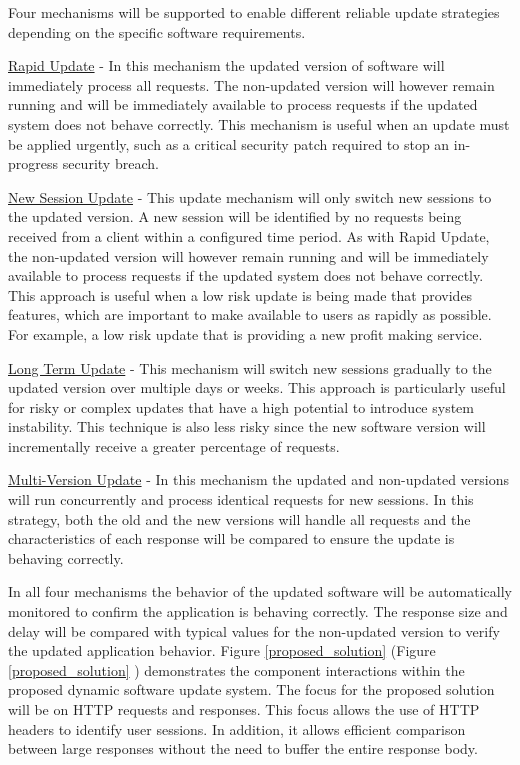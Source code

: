 \documentclass[a4paper,11pt,twoside]{article}
\begin{document}
Four mechanisms will be supported to enable different reliable update strategies depending on the specific software requirements.

\underline{Rapid Update} -  In this mechanism the updated version of software will immediately process all requests. The non-updated version will however remain running and will be immediately available to process requests if the updated system does not behave correctly. This mechanism is useful when an update must be applied urgently, such as a critical security patch required to stop an in-progress security breach.

\underline{New Session Update} - This update mechanism will only switch new sessions to the updated version. A new session will be identified by no requests being received from a client within a configured time period. As with Rapid Update, the non-updated version will however remain running and will be immediately available to process requests if the updated system does not behave correctly. This approach is useful when a low risk update is being made that provides features, which are important to make available to users as rapidly as possible. For example, a low risk update that is providing a new profit making service.

\underline{Long Term Update} - This mechanism will switch new sessions gradually to the updated version over multiple days or weeks. This approach is particularly useful for risky or complex updates that have a high potential to introduce system instability. This technique is also less risky since the new software version will incrementally receive a greater percentage of requests.

\underline{Multi-Version Update} - In this mechanism the updated and non-updated versions will run concurrently and  process identical requests for new sessions.  In this strategy, both the old and the new versions will handle all requests and the characteristics of each response will be compared to ensure the update is behaving correctly.

In all four mechanisms the behavior of the updated software will be automatically monitored to confirm the application is behaving correctly. The response size and delay will be compared with typical values for the non-updated version to verify the updated application behavior. Figure \ref{proposed_solution} (Figure \ref{proposed_solution} ) demonstrates the component interactions within the proposed dynamic software update system.  The focus for the proposed solution will be on HTTP requests and responses.  This focus allows the use of HTTP headers to identify user sessions.  In addition, it allows efficient comparison between large responses without the need to buffer the entire response body.\\\\
\end{document}
